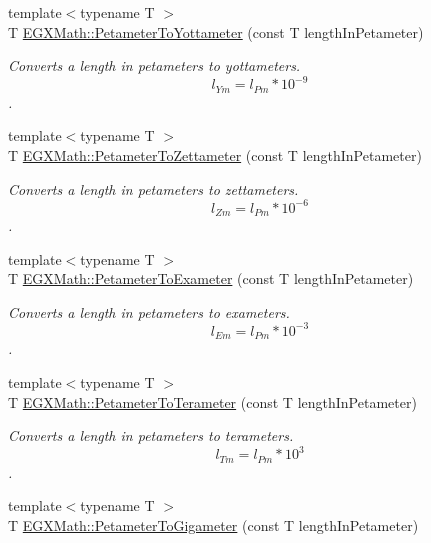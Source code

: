 \begin{DoxyCompactItemize}
{\footnotesize template$<$typename T $>$ }\\T \mbox{\hyperlink{group___e_g_x_math-_conversions-_length_conversions-_s_i-_petameter-_s_i_ga9ffc5119dfdd8427918e9f6cd6e4c2c8}{E\+G\+X\+Math\+::\+Petameter\+To\+Yottameter}} (const T length\+In\+Petameter)
\begin{DoxyCompactList}\small\item\em Converts a length in petameters to yottameters. \[ l_{Ym}=l_{Pm} * 10^{-9} \]. \end{DoxyCompactList}\item 
{\footnotesize template$<$typename T $>$ }\\T \mbox{\hyperlink{group___e_g_x_math-_conversions-_length_conversions-_s_i-_petameter-_s_i_gabea28636f814fa1d8a3ce9590478e3e4}{E\+G\+X\+Math\+::\+Petameter\+To\+Zettameter}} (const T length\+In\+Petameter)
\begin{DoxyCompactList}\small\item\em Converts a length in petameters to zettameters. \[ l_{Zm}=l_{Pm} * 10^{-6} \]. \end{DoxyCompactList}\item 
{\footnotesize template$<$typename T $>$ }\\T \mbox{\hyperlink{group___e_g_x_math-_conversions-_length_conversions-_s_i-_petameter-_s_i_gade75826e3cd26e484252c5d5a9d1bf8c}{E\+G\+X\+Math\+::\+Petameter\+To\+Exameter}} (const T length\+In\+Petameter)
\begin{DoxyCompactList}\small\item\em Converts a length in petameters to exameters. \[ l_{Em}=l_{Pm} * 10^{-3} \]. \end{DoxyCompactList}\item 
{\footnotesize template$<$typename T $>$ }\\T \mbox{\hyperlink{group___e_g_x_math-_conversions-_length_conversions-_s_i-_petameter-_s_i_ga49df669a2666aa9681c907ea80e4c34c}{E\+G\+X\+Math\+::\+Petameter\+To\+Terameter}} (const T length\+In\+Petameter)
\begin{DoxyCompactList}\small\item\em Converts a length in petameters to terameters. \[ l_{Tm}=l_{Pm} * 10^{3} \]. \end{DoxyCompactList}\item 
{\footnotesize template$<$typename T $>$ }\\T \mbox{\hyperlink{group___e_g_x_math-_conversions-_length_conversions-_s_i-_petameter-_s_i_ga421403e7220de552c73ae8e3e1edefd1}{E\+G\+X\+Math\+::\+Petameter\+To\+Gigameter}} (const T length\+In\+Petameter)

\end{DoxyCompactItemize}

